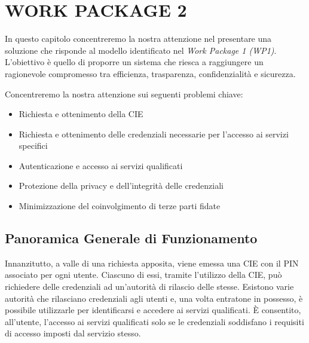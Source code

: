 \chapter{WORK PACKAGE 2}
In questo capitolo concentreremo la nostra attenzione nel presentare una soluzione che risponde al modello identificato nel \textit{Work Package 1 (WP1)}. L’obiettivo è quello di proporre un sistema che riesca a raggiungere un ragionevole compromesso tra efficienza, trasparenza, confidenzialità e sicurezza.

\noindent Concentreremo la nostra attenzione sui seguenti problemi chiave:
    \begin{itemize}
        \item Richiesta e ottenimento della CIE
        
        \item Richiesta e ottenimento delle credenziali necessarie per l'accesso ai servizi specifici
        
        \item Autenticazione e accesso ai servizi qualificati
    
        \item Protezione della privacy e dell'integrità delle credenziali
    
        \item Minimizzazione del coinvolgimento di terze parti fidate
    \end{itemize}


    \section{Panoramica Generale di Funzionamento}
        Innanzitutto, a valle di una richiesta apposita, viene emessa una CIE con il PIN associato per ogni utente.
        Ciascuno di essi, tramite l'utilizzo della CIE, può richiedere delle credenziali ad un'autorità di rilascio delle stesse.
        Esistono varie autorità che rilasciano credenziali agli utenti e, una volta entratone in possesso, è possibile utilizzarle per identificarsi e accedere ai servizi qualificati.
        È consentito, all’utente, l'accesso ai servizi qualificati solo se le credenziali soddisfano i requisiti di accesso imposti dal servizio stesso.


